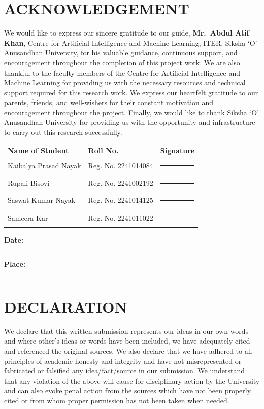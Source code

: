 \documentclass[12pt,a4paper]{report}
\begin{document}
\chapter*{ACKNOWLEDGEMENT}
We would like to express our sincere gratitude to our guide, \textbf{Mr.\ Abdul Atif Khan}, Centre for Artificial Intelligence and Machine Learning, ITER, Siksha `O' Anusandhan University, for his valuable guidance, continuous support, and encouragement throughout the completion of this project work. We are also thankful to the faculty members of the Centre for Artificial Intelligence and Machine Learning for providing us with the necessary resources and technical support required for this research work. We express our heartfelt gratitude to our parents, friends, and well-wishers for their constant motivation and encouragement throughout the project. Finally, we would like to thank Siksha `O' Anusandhan University for providing us with the opportunity and infrastructure to carry out this research successfully.
\vfill
\begin{center}
\begin{tabular}{p{5.2cm}p{5.8cm}p{3.2cm}}
\textbf{Name of Student} & \textbf{Roll No.} & \textbf{Signature} \\[1em]
Kaibalya Prasad Nayak & Reg. No. 2241014084& \rule{3.2cm}{0.2pt} \\[1em]
Rupali Bisoyi & Reg. No. 2241002192& \rule{3.2cm}{0.2pt} \\[1em]
Saswat Kumar Nayak & Reg. No. 2241014125& \rule{3.2cm}{0.2pt} \\[1em]
Sameera Kar & Reg. No. 2241011022& \rule{3.2cm}{0.2pt} \\[1em]
\end{tabular}
\end{center}
\vspace{1cm}
\noindent\textbf{Date:} \rule{5cm}{0.2pt} \hfill \textbf{Place:} \rule{5cm}{0.2pt}


\chapter*{DECLARATION}
We declare that this written submission represents our ideas in our own words and where other’s ideas or words have been included, we have adequately cited and referenced the original sources. We also declare that we have adhered to all principles of academic honesty and integrity and have not misrepresented or fabricated or falsified any idea/fact/source in our submission. We understand that any violation of 
the above will cause for disciplinary action by the University and can also evoke penal action from the sources which have not been properly cited or from whom proper permission has not been taken when needed.
\vspace{1cm}
\end{document}
